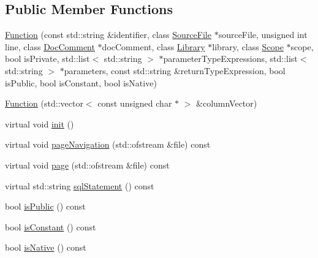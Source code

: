 \subsection*{Public Member Functions}
\begin{CompactItemize}
\item 
\hyperlink{classvjassdoc_1_1Function_3505663616782b94aa01a36b789a101b}{Function} (const std::string \&identifier, class \hyperlink{classvjassdoc_1_1SourceFile}{SourceFile} $\ast$sourceFile, unsigned int line, class \hyperlink{classvjassdoc_1_1DocComment}{DocComment} $\ast$docComment, class \hyperlink{classvjassdoc_1_1Library}{Library} $\ast$library, class \hyperlink{classvjassdoc_1_1Scope}{Scope} $\ast$scope, bool isPrivate, std::list$<$ std::string $>$ $\ast$parameterTypeExpressions, std::list$<$ std::string $>$ $\ast$parameters, const std::string \&returnTypeExpression, bool isPublic, bool isConstant, bool isNative)
\item 
\hyperlink{classvjassdoc_1_1Function_3afaafa500bcad415988b9882528b0a7}{Function} (std::vector$<$ const unsigned char $\ast$ $>$ \&columnVector)
\item 
virtual void \hyperlink{classvjassdoc_1_1Function_031d74f7df7c29afb36626fd335b2037}{init} ()
\item 
virtual void \hyperlink{classvjassdoc_1_1Function_b0776a1e111d7fcefbbcecd92f210a48}{pageNavigation} (std::ofstream \&file) const 
\item 
virtual void \hyperlink{classvjassdoc_1_1Function_7f32865b4c3f9f4c4e6379a437f5bdfe}{page} (std::ofstream \&file) const 
\item 
virtual std::string \hyperlink{classvjassdoc_1_1Function_7e4a84e1bb86ade42e6a95d81d8092a7}{sqlStatement} () const 
\item 
bool \hyperlink{classvjassdoc_1_1Function_a8a4c34f800506e7803f875a831014b9}{isPublic} () const 
\item 
bool \hyperlink{classvjassdoc_1_1Function_d94c62d16b874437ed1bb59958f79063}{isConstant} () const 
\item 
bool \hyperlink{classvjassdoc_1_1Function_a4100d5c17d58de39de87648566f5d8b}{isNative} () const 
\end{CompactItemize}


